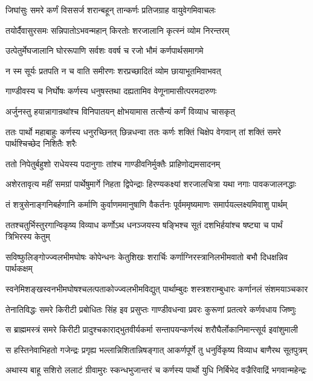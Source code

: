 \twolineshloka
{जिघांसुः समरे कर्णं विससर्ज शरान्बहून्}
{तान्कर्णः प्रतिजग्राह वायुवेगमिवाचलः}


\twolineshloka
{तयोर्दैवासुरसमः सन्निपातोऽभवन्महान्}
{किरतोः शरजालानि कृत्स्नं व्योम निरन्तरम्}


\twolineshloka
{उत्पेतुर्मेघजालानि घोररूपाणि सर्वशः}
{ववर्ष च रजो भौमं कर्णपार्थसमागमे}


\twolineshloka
{न स्म सूर्यः प्रतपति न च वाति समीरणः}
{शरप्रच्छादितं व्योम छायाभूतमिवाभवत्}


\twolineshloka
{गाण्डीवस्य च निर्घोषः कर्णस्य धनुषस्तथा}
{दह्यतामिव वेणूनामासीत्परमदारुणः}


\twolineshloka
{अर्जुनस्तु हयान्नागान्रथांश्च विनिपातयन्}
{क्षोभयामास तत्सैन्यं कर्णं विव्याध चासकृत्}


\threelineshloka
{ततः पार्थो महाबाहुः कर्णस्य धनुरच्छिनत्}
{छिन्नधन्वा ततः कर्णः शक्तिं चिक्षेप वेगवान्}
{तां शक्तिं समरे पार्थश्चिच्छेद निशितैः शरैः}


\twolineshloka
{ततो निपेतुर्बहुशो राधेयस्य पदानुगाः}
{तांश्च गाण्डीवनिर्मुक्तैः प्राहिणोद्यमसादनम्}


\twolineshloka
{अशेरतावृत्य महीं समग्रां पार्थेषुमार्गे निहता द्विपेन्द्राः}
{हिरण्यकक्ष्यां शरजालचित्रा यथा नगाः पावकजालनद्धाः}


\twolineshloka
{तं शत्रुसेनाङ्गनिबर्हणानि कर्माणि कुर्वाणममानुषाणि}
{वैकर्तनः पूर्वममृष्यमाणः समार्पयल्लक्ष्यमिवाशु पार्थम्}


\twolineshloka
{ततश्चतुर्भिस्तुरगान्विकृष्य विव्याध कर्णोऽथ धनञ्जयस्य}
{षङ्भिश्च सूतं दशभिर्हयांश्च षष्ट्या च पार्थं त्रिभिरस्य केतुम्}


\twolineshloka
{सविष्फुलिङ्गोज्ज्वलभीमघोषः कोपेन्धनः केतुशिखः शरार्चिः}
{कर्णाग्निरस्त्रानिलभीमवातो बभौ दिधक्षन्निव पार्थकक्षम्}


\twolineshloka
{स्वनेमिशङ्खस्वनभीमघोषश्चलत्पताकोज्ज्वलभीमविद्युत्}
{पार्थाम्बुदः शस्त्रशराम्बुधारः कर्णानलं संशमयाञ्चकार}


\twolineshloka
{तेनातिविद्धः समरे किरीटी प्रबोधितः सिंह इव प्रसुप्तः}
{गाण्डीवधन्वा प्रवरः कुरूणां प्रतत्वरे कर्णवधाय जिष्णुः}


\twolineshloka
{स ब्राह्ममस्त्रं समरे किरीटी प्रादुश्चकाराद्भुतवीर्यकर्मा}
{सन्तापयन्कर्णरथं शरौघैर्लोकानिमान्त्सूर्य इवांशुमाली}


\twolineshloka
{स हस्तिनेवाभिहतो गजेन्द्रः प्रगृह्य भल्लान्निशितान्निषङ्गात्}
{आकर्णपूर्णे तु धनुर्विकृष्य विव्याध बाणैरथ सूतपुत्रम्}


\twolineshloka
{अथास्य बाहू सशिरो ललाटं ग्रीवामुरः स्कन्धभुजान्तरं च}
{कर्णस्य पार्थो युधि निर्बिभेद वज्रैरिवाद्रिं भगवान्महेन्द्रः}


